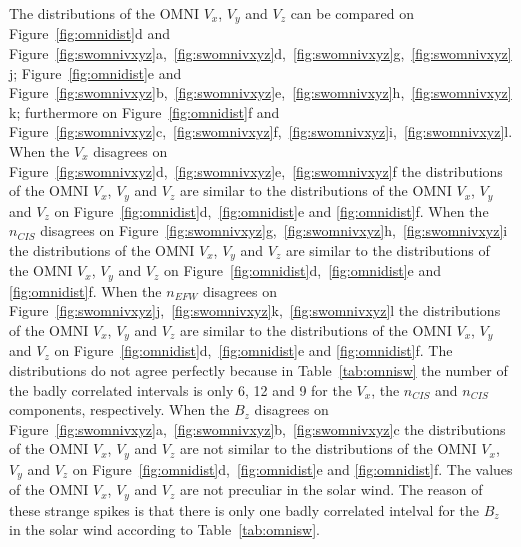 \documentclass[linenumbers,draft]{agujournal}
\begin{document}
The distributions of the OMNI $V_{x}$, $V_{y}$ and $V_{z}$ can be compared on Figure~\ref{fig:omnidist}d and Figure~\ref{fig:swomnivxyz}a,~\ref{fig:swomnivxyz}d,~\ref{fig:swomnivxyz}g,~\ref{fig:swomnivxyz}j; Figure~\ref{fig:omnidist}e and Figure~\ref{fig:swomnivxyz}b,~\ref{fig:swomnivxyz}e,~\ref{fig:swomnivxyz}h,~\ref{fig:swomnivxyz}k; furthermore on Figure~\ref{fig:omnidist}f and Figure~\ref{fig:swomnivxyz}c,~\ref{fig:swomnivxyz}f,~\ref{fig:swomnivxyz}i,~\ref{fig:swomnivxyz}l. When the $V_{x}$ disagrees on Figure~\ref{fig:swomnivxyz}d,~\ref{fig:swomnivxyz}e,~\ref{fig:swomnivxyz}f the distributions of the OMNI $V_{x}$, $V_{y}$ and $V_{z}$ are similar to the distributions of the OMNI $V_{x}$, $V_{y}$ and $V_{z}$ on Figure~\ref{fig:omnidist}d,~\ref{fig:omnidist}e and \ref{fig:omnidist}f. When the $n_{CIS}$ disagrees on Figure~\ref{fig:swomnivxyz}g,~\ref{fig:swomnivxyz}h,~\ref{fig:swomnivxyz}i the distributions of the OMNI $V_{x}$, $V_{y}$ and $V_{z}$ are similar to the distributions of the OMNI $V_{x}$, $V_{y}$ and $V_{z}$ on Figure~\ref{fig:omnidist}d,~\ref{fig:omnidist}e and \ref{fig:omnidist}f. When the $n_{EFW}$ disagrees on Figure~\ref{fig:swomnivxyz}j,~\ref{fig:swomnivxyz}k,~\ref{fig:swomnivxyz}l the distributions of the OMNI $V_{x}$, $V_{y}$ and $V_{z}$ are similar to the distributions of the OMNI $V_{x}$, $V_{y}$ and $V_{z}$ on Figure~\ref{fig:omnidist}d,~\ref{fig:omnidist}e and \ref{fig:omnidist}f. The distributions do not agree perfectly because in Table~\ref{tab:omnisw} the number of the badly correlated intervals is only 6, 12 and 9 for the $V_{x}$, the $n_{CIS}$ and $n_{CIS}$ components, respectively. When the $B_{z}$ disagrees on Figure~\ref{fig:swomnivxyz}a,~\ref{fig:swomnivxyz}b,~\ref{fig:swomnivxyz}c the distributions of the OMNI $V_{x}$, $V_{y}$ and $V_{z}$ are not similar to the distributions of the OMNI $V_{x}$, $V_{y}$ and $V_{z}$ on Figure~\ref{fig:omnidist}d,~\ref{fig:omnidist}e and \ref{fig:omnidist}f. The values of the OMNI $V_{x}$, $V_{y}$ and $V_{z}$ are not preculiar in the solar wind. The reason of these strange spikes is that there is only one badly correlated intelval for the $B_{z}$ in the solar wind according to Table~\ref{tab:omnisw}.
\end{document}
